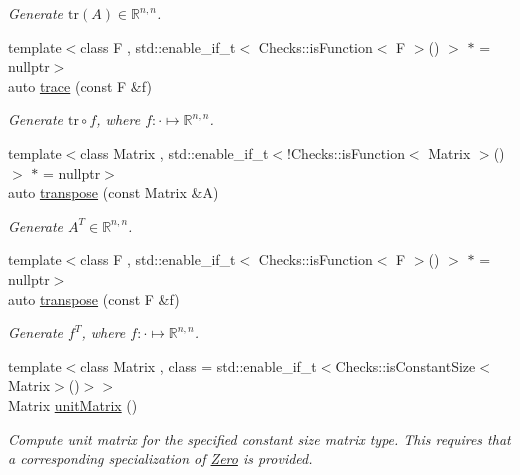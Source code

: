 \begin{DoxyCompactItemize}
\begin{DoxyCompactList}\small\item\em \-Generate $\mathrm{tr}(A)\in\mathbb{R}^{n,n}$. \end{DoxyCompactList}\item 
{\footnotesize template$<$class F , std\-::enable\-\_\-if\-\_\-t$<$ Checks\-::is\-Function$<$ F $>$() $>$ $\ast$  = nullptr$>$ }\\auto \hyperlink{group__LinearAlgebraGroup_ga950717870525c43be79245413717673c}{trace} (const \-F \&f)
\begin{DoxyCompactList}\small\item\em \-Generate $\mathrm{tr}\circ f$, where $f:\cdot\mapsto\mathbb{R}^{n,n} $. \end{DoxyCompactList}\item 
{\footnotesize template$<$class Matrix , std\-::enable\-\_\-if\-\_\-t$<$!\-Checks\-::is\-Function$<$ Matrix $>$()$>$ $\ast$  = nullptr$>$ }\\auto \hyperlink{group__LinearAlgebraGroup_ga6110875ecb3c2559f8f4b42a3627a65b}{transpose} (const \-Matrix \&\-A)
\begin{DoxyCompactList}\small\item\em \-Generate $A^T\in\mathbb{R}^{n,n}$. \end{DoxyCompactList}\item 
{\footnotesize template$<$class F , std\-::enable\-\_\-if\-\_\-t$<$ Checks\-::is\-Function$<$ F $>$() $>$ $\ast$  = nullptr$>$ }\\auto \hyperlink{group__LinearAlgebraGroup_ga410ef1b161789c0c9f01ae5f5caf058f}{transpose} (const \-F \&f)
\begin{DoxyCompactList}\small\item\em \-Generate $f^T$, where $f:\cdot\mapsto\mathbb{R}^{n,n} $. \end{DoxyCompactList}\item 
{\footnotesize template$<$class Matrix , class  = std\-::enable\-\_\-if\-\_\-t$<$\-Checks\-::is\-Constant\-Size$<$\-Matrix$>$()$>$$>$ }\\\-Matrix \hyperlink{group__LinearAlgebraGroup_ga88a596b8526c0ed98ce241244fb85948}{unit\-Matrix} ()
\begin{DoxyCompactList}\small\item\em \-Compute unit matrix for the specified constant size matrix type. \-This requires that a corresponding specialization of \hyperlink{structFunG_1_1Zero}{\-Zero} is provided. \end{DoxyCompactList}\item 

\end{DoxyCompactItemize}
